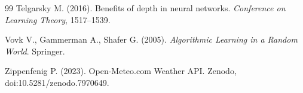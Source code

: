 \documentclass[11pt,a4paper]{article}
\begin{document}
\begin{thebibliography}{99}
Telgarsky M. (2016). Benefits of depth in neural networks. \emph{Conference on Learning Theory}, 1517--1539.

Vovk V., Gammerman A., Shafer G. (2005). \emph{Algorithmic Learning in a Random World}. Springer.

Zippenfenig P. (2023). Open-Meteo.com Weather API. Zenodo, doi:10.5281/zenodo.7970649.

\end{thebibliography}
\end{document}

